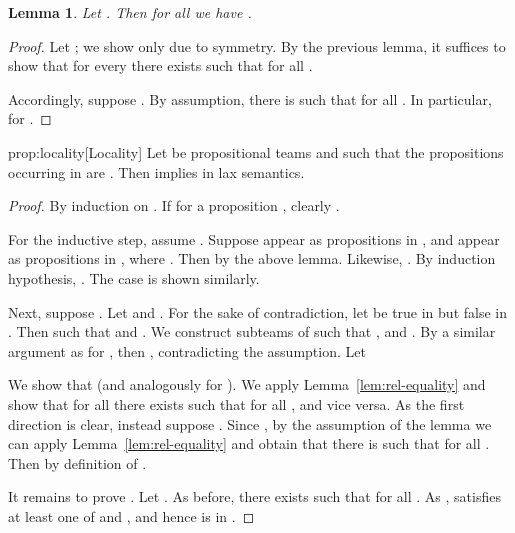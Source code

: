 \documentclass[a4paper,english,fleqn,11pt,final]{scrartcl}
\theoremstyle{plain}
\newtheorem{lemma}[theorem]{Lemma}
\theoremstyle{definition}
\begin{document}
\begin{lemma}
Let .
Then for all  we have .
\end{lemma}
\begin{proof}
Let ; we show only  due to symmetry.
By the previous lemma, it suffices to show that for every  there exists  such that  for all .

Accordingly, suppose .
By assumption, there is  such that  for all .
In particular,  for .
\end{proof}


\begin{repproposition}{prop:locality}[Locality]
Let  be propositional teams and  such that the propositions occurring in  are .
Then  implies  in lax semantics.
\end{repproposition}
\begin{proof}
By induction on .
If  for a proposition , clearly .

For the inductive step, assume .
Suppose  appear as propositions in , and  appear as propositions in , where .
Then  by the above lemma.
Likewise, .
By induction hypothesis, .
The case  is shown similarly.

Next, suppose .
Let  and .
For the sake of contradiction, let  be true in  but false in .
Then  such that  and .
We construct subteams  of  such that ,  and .
By a similar argument as for , then , contradicting the assumption.
Let


We show that   (and analogously for ).
We apply Lemma~\ref{lem:rel-equality} and show that for all  there exists   such that  for all , and vice versa.
As the first direction is clear, instead suppose .
Since , by the assumption of the lemma we can apply Lemma~\ref{lem:rel-equality} and obtain that there is  such that  for all .
Then  by definition of .

It remains to prove .
Let .
As before, there exists  such that  for all .
As ,  satisfies at least one of  and , and hence is in .
\end{proof}
\end{document}
